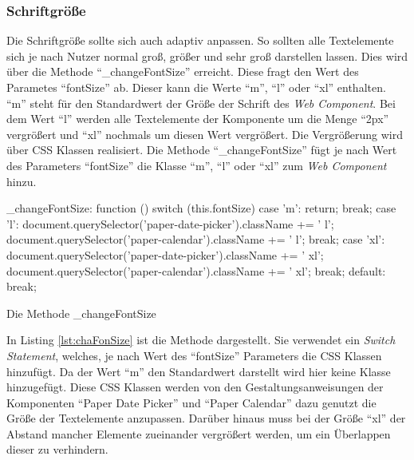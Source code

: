 \documentclass[12pt, paper=a4, bibtotoc, toc=listof, headsepline=true]{scrreprt}
\begin{document}
		\subsubsection{Schriftgröße}
		Die Schriftgröße sollte sich auch adaptiv anpassen. So sollten alle Textelemente sich je nach Nutzer normal groß, größer und sehr groß darstellen lassen. Dies wird über die Methode \enquote{\_changeFontSize} erreicht. Diese fragt den Wert des Parametes \enquote{fontSize} ab. Dieser kann die Werte \enquote{m}, \enquote{l} oder \enquote{xl} enthalten. \enquote{m} steht für den Standardwert der Größe der Schrift des \emph{Web Component}. Bei dem Wert \enquote{l} werden alle Textelemente der Komponente um die Menge \enquote{2px} vergrößert und \enquote{xl} nochmals um diesen Wert vergrößert. Die Vergrößerung wird über \ac{CSS} Klassen realisiert. Die Methode \enquote{\_changeFontSize} fügt je nach Wert des Parameters \enquote{fontSize} die Klasse \enquote{m}, \enquote{l} oder \enquote{xl} zum \emph{Web Component} hinzu.
		\begin{listing}
			\begin{JavaScriptcode*}{}
_changeFontSize: function () {
   switch (this.fontSize){
      case 'm':
         return;
         break;
      case 'l':
         document.querySelector('paper-date-picker').className += ' l';
         document.querySelector('paper-calendar').className += ' l';
         break;
      case 'xl':
         document.querySelector('paper-date-picker').className += ' xl';
         document.querySelector('paper-calendar').className += ' xl';
         break;
      default:
         break;
   }
}
			\end{JavaScriptcode*}
			\caption{Die Methode \_changeFontSize}
			\label{lst:chaFonSize}
		\end{listing}
		In Listing \ref{lst:chaFonSize} ist die Methode dargestellt. Sie verwendet ein \emph{Switch Statement}, welches, je nach Wert des \enquote{fontSize} Parameters die \ac{CSS} Klassen hinzufügt. Da der Wert \enquote{m} den Standardwert darstellt wird hier keine Klasse hinzugefügt.
		Diese \ac{CSS} Klassen werden von den Gestaltungsanweisungen der Komponenten \enquote{Paper Date Picker} und \enquote{Paper Calendar} dazu genutzt die Größe der Textelemente anzupassen. Darüber hinaus muss bei der Größe \enquote{xl} der Abstand mancher Elemente zueinander vergrößert werden, um ein Überlappen dieser zu verhindern.
\end{document}
